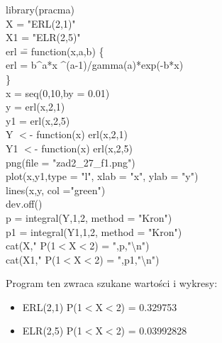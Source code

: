 \documentclass{article}
\begin{document}
{{\selectfont
\begin{tabbing}
library(pracma) \\
X = "ERL(2,1)" \\
X1 = "ELR(2,5)" \\
erl \= = function(x,a,b) \{ \+ \\
	erl = b\textasciicircum a*x \textasciicircum(a-1)/gamma(a)*exp(-b*x) \- \\
\} \\
x = seq(0,10,by = 0.01) \\
y = erl(x,2,1) \\
y1 = erl(x,2,5) \\
Y $<$- function(x) erl(x,2,1) \\ 
Y1 $<$- function(x) erl(x,2,5) \\
png(file = "zad2\_27\_f1.png") \\
plot(x,y1,type = "l", xlab = "x", ylab = "y") \\
lines(x,y, col ="green") \\
dev.off() \\
p = integral(Y,1,2, method = "Kron") \\
p1 = integral(Y1,1,2, method = "Kron") \\
cat(X," P(1$<$X$<$2) = ",p,"\textbackslash n") \\
cat(X1," P(1$<$X$<$2) = ",p1,"\textbackslash n") \\
\end{tabbing}
}
Program ten zwraca szukane wartości i wykresy:
\begin{itemize}
\item ERL(2,1)  P(1$<$X$<$2) =  0.329753 
\item ELR(2,5)  P(1$<$X$<$2) =  0.03992828
\end{itemize}

}
\end{document}
